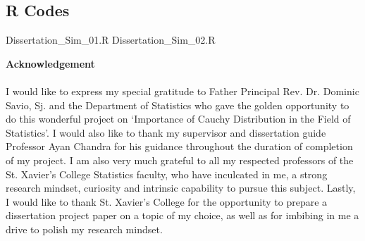\documentclass[12pt, fleqn, a4paper]{article}
\begin{document}
	\newpage
	\subsection{R Codes}
	\begin{spacing}{1.1}
		 {Dissertation_Sim_01.R}
		\vspace{20pt}
		 {Dissertation_Sim_02.R}
%	
	\end{spacing}

	\newpage
	\centering {}
	\null\vfill
	\textbf{\Large Acknowledgement}
	\paragraph{} \justifying 
	I would like to express my special gratitude to Father Principal Rev. Dr. Dominic Savio, Sj. and the Department of Statistics who gave the golden opportunity to do this wonderful project on `Importance of Cauchy Distribution in the Field of Statistics'. I would also like to thank my supervisor and dissertation guide Professor Ayan Chandra for his guidance throughout the duration of completion of my project. I am also very much grateful to all my respected professors of the St. Xavier’s College Statistics faculty, who have inculcated in me, a strong research mindset, curiosity and intrinsic capability to pursue this subject. Lastly, I would like to thank St. Xavier’s College for the opportunity to prepare a dissertation project paper on a topic of my choice, as well as for imbibing in me a drive to polish my research mindset. 
	\vfill \null 
	
	\cleardoublepage
	
	\nocite{*}
	
	
	
\end{document}

